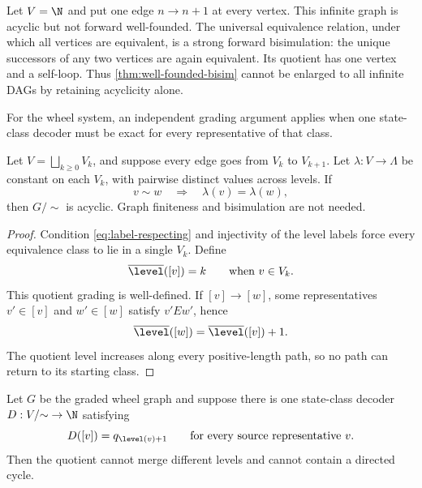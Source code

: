 \begin{remark}
\label{rem:infinite-ray}
Let $V=\N$ and put one edge $n\to n+1$ at every vertex.  This infinite graph
is acyclic but not forward well-founded.  The universal equivalence relation,
under which all vertices are equivalent, is a strong forward bisimulation:
the unique successors of any two vertices are again equivalent.  Its quotient
has one vertex and a self-loop.  Thus \cref{thm:well-founded-bisim} cannot be
enlarged to all infinite DAGs by retaining acyclicity alone.
\end{remark}

For the wheel system, an independent grading argument applies when one
state-class decoder must be exact for every representative of that class.

\begin{proposition}
\label{prop:label-grading}
Let $V=\bigsqcup_{k\geq0}V_k$, and suppose every edge goes from $V_k$ to
$V_{k+1}$.  Let $\lambda:V\to\Lambda$ be constant on each $V_k$, with
pairwise distinct values across levels.  If
\begin{equation}
  v\sim w \quad\Longrightarrow\quad \lambda(v)=\lambda(w),
  \label{eq:label-respecting}
\end{equation}
then $G/{\sim}$ is acyclic.  Graph finiteness and bisimulation are not needed.
\end{proposition}

\begin{proof}
Condition \eqref{eq:label-respecting} and injectivity of the level labels
force every equivalence class to lie in a single $V_k$.  Define
\[
  \overline{\level}([v])=k \qquad\text{when }v\in V_k.
\]
This quotient grading is well-defined.  If $[v]\to[w]$, some representatives
$v'\in[v]$ and $w'\in[w]$ satisfy $v'Ew'$, hence
\[
  \overline{\level}([w])=\overline{\level}([v])+1.
\]
The quotient level increases along every positive-length path, so no path can
return to its starting class.
\end{proof}

\begin{corollary}
\label{cor:q-label}
Let $G$ be the graded wheel graph and suppose there is one state-class decoder
$D:V/{\sim}\to\N$ satisfying
\begin{equation}
  D([v])=q_{\level(v)+1}
  \qquad\text{for every source representative }v.
  \label{eq:class-decoder-exact}
\end{equation}
Then the quotient cannot merge different levels and cannot contain a directed
cycle.
\end{corollary}

